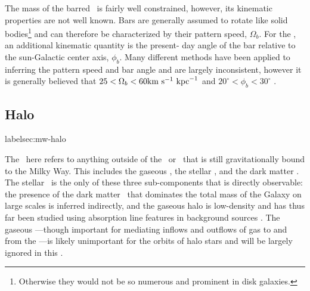 The mass of the barred \mwbulge\ is fairly well constrained, however, its
kinematic properties are not well known. Bars are generally assumed to rotate
like solid bodies\footnote{Otherwise they would not be so numerous and prominent
in disk galaxies.} and can therefore be characterized by their pattern speed,
$\Omega_b$. For the \mwbulge, an additional kinematic quantity is the present-
day angle of the bar relative to the sun-Galactic center axis, $\phi_b$. Many
different methods have been applied to inferring the pattern speed and bar angle
and are largely inconsistent, however it is generally believed that $25 <
\Omega_b < 60 \mathrm{km}~\mathrm{s}^{-1}~\mathrm{kpc}^{-1}$ and $20^\circ < \phi_b < 30^\circ$ \citep{dwek95,
stanek97, debattista02, shen10, wegg13, cao13, wegg15, portail15}.


\subsection{Halo}label{sec:mw-halo}

The \mwhalo\ here refers to anything outside of the \mwdisk\ or \mwbulge\ that
is still gravitationally bound to the Milky Way. This includes the gaseous
\mwhalo, the stellar \mwhalo, and the dark matter \mwhalo. The stellar \mwhalo\
is the only of these three sub-components that is directly observable: the
presence of the dark matter \mwhalo\ that dominates the total mass of the Galaxy
on large scales is inferred indirectly, and the gaseous halo is low-density and
has thus far been studied using absorption line features in background sources
\citep{miller13}. The gaseous \mwhalo---though important for mediating inflows
and outflows of gas to and from the \mwdisk---is likely unimportant for the
orbits of halo stars and will be largely ignored in this \article. %
\citep[$M_{\rm h:g} \approx 10^{10}~\msun \ll $][]{blitz10, salem15}

